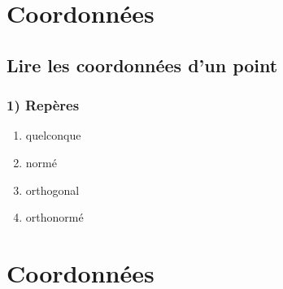 \documentclass[
    a4paper,
    12pt,
    mathserif,
    handout
    ]{beamer}
\begin{document}



\section{Coordonnées}
\subsection{Lire les coordonnées d'un point}
\begin{frame}
\frametitle{1) Repères}
\begin{enumerate}[]
	\item quelconque
	\item normé
	\item orthogonal
	\item orthonormé
\end{enumerate}

\end{frame}

\section{Coordonnées}
\end{document}
